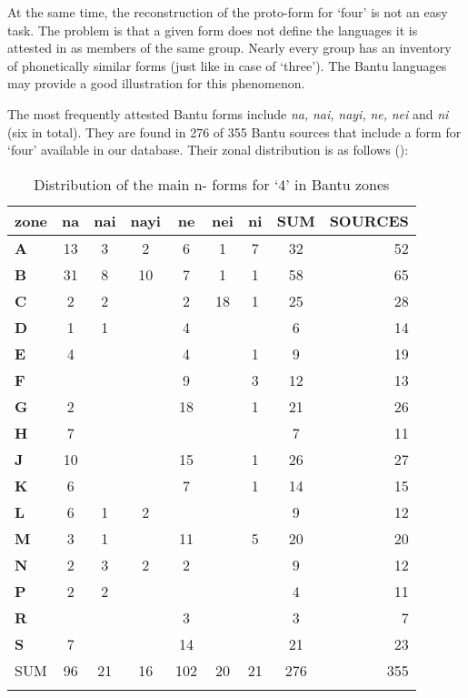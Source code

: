 At the same time, the reconstruction of the proto-form for ‘four’ is not an easy task. The problem is that a given form does not define the languages it is attested in as members of the same group. Nearly every group has an inventory of phonetically similar forms (just like in case of ‘three’). The Bantu languages may provide a good illustration for this phenomenon. 

The most frequently attested Bantu forms include \textit{na,} \textit{nai,} \textit{nayi,} \textit{ne,} \textit{nei} and \textit{ni} (six in total). They are found in 276 of 355 Bantu sources that include a form for ‘four’ available in our database. Their zonal distribution is as follows ():   

\begin{table}
\caption{\label{tab:4:14}Distribution of the main n- forms for `4' in Bantu zones}


\begin{tabularx}{\textwidth}{lSSSSSSSr}
\lsptoprule
zone & \textbf{na} & \textbf{nai} & \textbf{nayi} & \textbf{ne} & \textbf{nei} & \textbf{ni} & SUM&SOURCES\\
\midrule
\textbf{A} & 13 & 3 & 2 & 6 & 1 & 7 & 32 & 52\\
\textbf{B} & 31 & 8 & 10 & 7 & 1 & 1 & 58 & 65\\
\textbf{C} & 2 & 2 & ~ & 2 & 18 & 1 & 25 & 28\\
\textbf{D} & 1 & 1 & ~ & 4 & ~ & ~ & 6 & 14\\
\textbf{E} & 4 & ~ & ~ & 4 & ~ & 1 & 9 & 19\\
\textbf{F} & ~ & ~ & ~ & 9 & ~ & 3 & 12 & 13\\
\textbf{G} & 2 & ~ & ~ & 18 & ~ & 1 & 21 & 26\\
\textbf{H} & 7 & ~ & ~ & ~ & ~ & ~ & 7 & 11\\
\textbf{J} & 10 & ~ & ~ & 15 & ~ & 1 & 26 & 27\\
\textbf{K} & 6 & ~ & ~ & 7 & ~ & 1 & 14 & 15\\
\textbf{L} & 6 & 1 & 2 & ~ & ~ & ~ & 9 & 12\\
\textbf{M} & 3 & 1 & ~ & 11 & ~ & 5 & 20 & 20\\
\textbf{N} & 2 & 3 & 2 & 2 & ~ & ~ & 9 & 12\\
\textbf{P} & 2 & 2 & ~ & ~ & ~ & ~ & 4 & 11\\
\textbf{R} & ~ & ~ & ~ & 3 & ~ & ~ & 3 & 7\\
\textbf{S} & 7 & ~ & ~ & 14 & ~ & ~ & 21 & 23\\
\midrule 
SUM & 96 & 21 & 16 & 102 & 20 & 21 & 276 & 355\\

\lspbottomrule
\end{tabularx}
\end{table}

